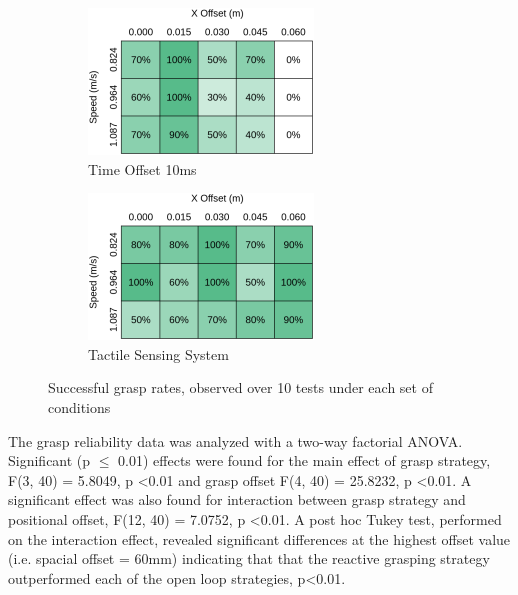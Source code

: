 \begin{figure}[ht]
\begin{subfigure}{.3\linewidth}
        \includegraphics[width=\textwidth]{Images/VisionResults10.png}
        \caption{Time Offset 10ms}
        \label{subfigure:TimeOffset10ms}
    \end{subfigure}
    \hfill
    \begin{subfigure}{.3\linewidth}
        \centering
        \includegraphics[width=\textwidth]{Images/Tactile.png}
        \caption{Tactile Sensing System}
        \label{subfigure:TactileSensingSystem}
    \end{subfigure}
    \caption{Successful grasp rates, observed over 10 tests under each set of conditions}
\label{fig:Results}
\end{figure}

The grasp reliability data was analyzed with a two-way factorial ANOVA. Significant (p $\leq$ 0.01) effects were found for the main effect of grasp strategy, F(3, 40) = 5.8049, p \textless 0.01 and grasp offset F(4, 40) = 25.8232, p \textless  0.01. A significant effect was also found for interaction between grasp strategy and positional offset, F(12, 40) = 7.0752, p \textless  0.01. A post hoc Tukey test, performed on the interaction effect, revealed significant differences at the highest offset value (i.e. spacial offset = 60mm) indicating that that the reactive grasping strategy outperformed each of the open loop strategies, p\textless0.01.

